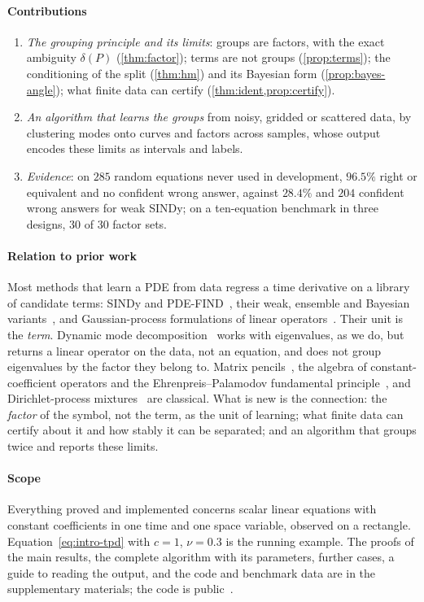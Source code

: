\documentclass[11pt]{article}
\theoremstyle{plain}
\theoremstyle{definition}
\theoremstyle{remark}
\newcommand{\deltaP}{\delta(P)}             %
\begin{document}
\paragraph{Contributions}
\begin{enumerate}
  \item \emph{The grouping principle and its limits}: groups are factors, with the exact ambiguity $\deltaP$
  (\cref{thm:factor}); terms are not groups (\cref{prop:terms}); the conditioning of the split (\cref{thm:hm}) and its
  Bayesian form (\cref{prop:bayes-angle}); what finite data can certify (\cref{thm:ident,prop:certify}).
  \item \emph{An algorithm that learns the groups} from noisy, gridded or scattered data, by clustering modes onto
  curves and factors across samples, whose output encodes these limits as intervals and labels.
  \item \emph{Evidence}: on $285$ random equations never used in development, $96.5\%$ right or equivalent and no
  confident wrong answer, against $28.4\%$ and $204$ confident wrong answers for weak SINDy; on a ten-equation
  benchmark in three designs, $30$ of $30$ factor sets.
\end{enumerate}

\paragraph{Relation to prior work}
Most methods that learn a PDE from data regress a time derivative on a library of candidate terms: SINDy and
PDE-FIND~\cite{BruProKut16,RudBruProKut17}, their weak, ensemble and Bayesian variants~\cite{MesBor21,FasKutBru22,HirBarKut22},
and Gaussian-process formulations of linear operators~\cite{RaiPerKar17}. Their unit is the \emph{term}. Dynamic mode
decomposition~\cite{Sch10,SasKut22} works with eigenvalues, as we do, but returns a linear operator on the data, not an
equation, and does not group eigenvalues by the factor they belong to. Matrix pencils~\cite{HuaSar90}, the algebra of
constant-coefficient operators and the Ehrenpreis--Palamodov fundamental principle~\cite{Ehr70,Pal70,Mal56,Hor90,Obe90},
and Dirichlet-process mixtures~\cite{BleJor06} are classical. What is new is the connection: the \emph{factor} of the
symbol, not the term, as the unit of learning; what finite data can certify about it and how stably it can be
separated; and an algorithm that groups twice and reports these limits.

\paragraph{Scope} Everything proved and implemented concerns scalar linear equations with constant coefficients in one
time and one space variable, observed on a rectangle. Equation~\eqref{eq:intro-tpd} with $c=1$, $\nu=0.3$ is the running
example. The proofs of the main results, the complete algorithm with its parameters, further cases, a guide to reading the
output, and the code and benchmark data are in the supplementary materials; the code is public~\cite{Pri26code}.
\end{document}
